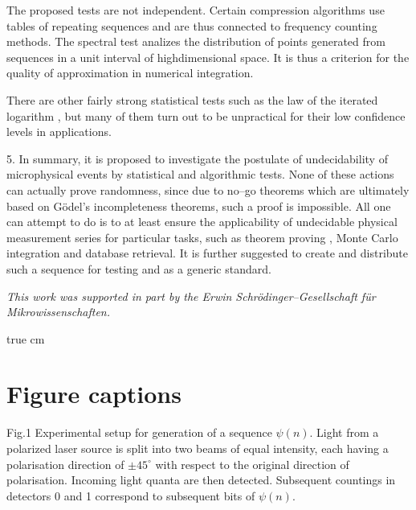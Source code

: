  The proposed tests are not independent. Certain compression algorithms
 use tables of repeating sequences and are thus connected to frequency
 counting methods. The spectral test analizes the distribution of
 points generated from sequences in a unit interval of highdimensional
 space. It is thus a criterion for the quality of approximation in
 numerical integration.

 There are other fairly strong statistical tests such as the law of the
 iterated logarithm \cite{feller1,lam1}, but many of them turn out to
 be unpractical for their low confidence levels in applications.

 5.
 In summary, it is proposed to investigate the postulate of
 undecidability of microphysical events by statistical and algorithmic
 tests. None of these actions can actually prove randomness, since
 due to no--go theorems which are ultimately based on G\"odel's
 incompleteness theorems, such a proof is impossible.
 All one can attempt to do is to at least ensure the applicability of
 undecidable physical measurement series for particular tasks, such as
 theorem proving \cite{r4}, Monte Carlo integration and database
 retrieval.
 It is further suggested to create and distribute such a sequence
 for testing and as a generic standard.


 {\it This work was supported in part by the Erwin
 Schr\"odinger--Gesellschaft f\"ur Mikrowissenschaften.}

 true cm
\section*{Figure captions}

{\sc Fig.1}
 Experimental setup for generation of a sequence $\psi (n)$.
 Light from a polarized laser source is split into two beams of equal
 intensity, each having a polarisation direction of $\pm 45^\circ $
 with respect to the original direction of polarisation. Incoming light
 quanta are then detected. Subsequent countings in detectors 0 and 1
 correspond to subsequent bits of $\psi (n)$.

